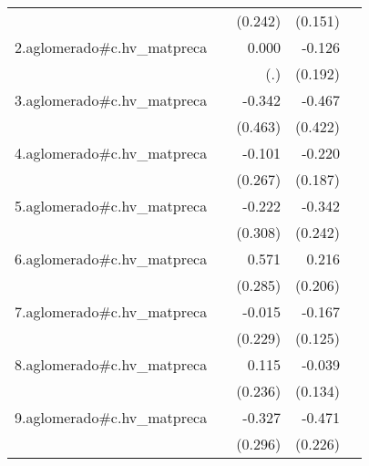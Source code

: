 {\begin{longtable}{l*{4}{D{.}{.}{-1}}}
            &                     &     (0.242)         &     (0.151)         &                     \\
\addlinespace
2.aglomerado#c.hv\_matpreca&                     &       0.000         &      -0.126         &                     \\
            &                     &         (.)         &     (0.192)         &                     \\
\addlinespace
3.aglomerado#c.hv\_matpreca&                     &      -0.342         &      -0.467         &                     \\
            &                     &     (0.463)         &     (0.422)         &                     \\
\addlinespace
4.aglomerado#c.hv\_matpreca&                     &      -0.101         &      -0.220         &                     \\
            &                     &     (0.267)         &     (0.187)         &                     \\
\addlinespace
5.aglomerado#c.hv\_matpreca&                     &      -0.222         &      -0.342         &                     \\
            &                     &     (0.308)         &     (0.242)         &                     \\
\addlinespace
6.aglomerado#c.hv\_matpreca&                     &       0.571\sym{*}  &       0.216         &                     \\
            &                     &     (0.285)         &     (0.206)         &                     \\
\addlinespace
7.aglomerado#c.hv\_matpreca&                     &      -0.015         &      -0.167         &                     \\
            &                     &     (0.229)         &     (0.125)         &                     \\
\addlinespace
8.aglomerado#c.hv\_matpreca&                     &       0.115         &      -0.039         &                     \\
            &                     &     (0.236)         &     (0.134)         &                     \\
\addlinespace
9.aglomerado#c.hv\_matpreca&                     &      -0.327         &      -0.471\sym{*}  &                     \\
            &                     &     (0.296)         &     (0.226)         &                     \\

\end{longtable}}
